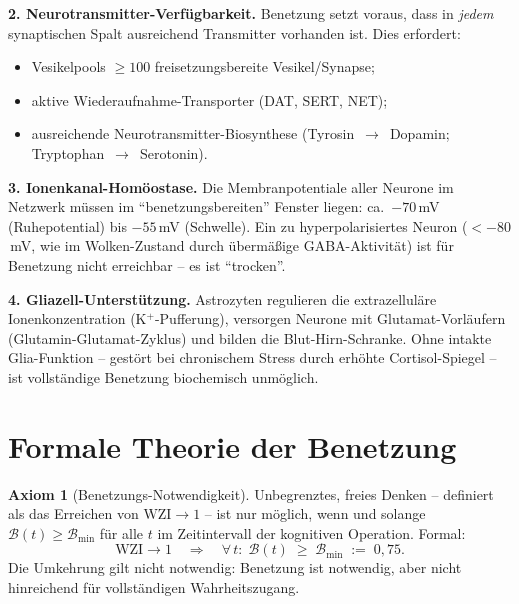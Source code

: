 ﻿\documentclass[12pt,a4paper]{report}
\theoremstyle{plain}
\theoremstyle{definition}
\newtheorem{axiom}[theorem]{Axiom}
\theoremstyle{remark}
\begin{document}
	\textbf{2. Neurotransmitter-Verfügbarkeit.}
	Benetzung setzt voraus, dass in \emph{jedem} synaptischen Spalt
	ausreichend Transmitter vorhanden ist. Dies erfordert:
	\begin{itemize}
		\item Vesikelpools $\geq 100$ freisetzungsbereite Vesikel/Synapse;
		\item aktive Wiederaufnahme-Transporter (DAT, SERT, NET);
		\item ausreichende Neurotransmitter-Biosynthese
		(Tyrosin~$\to$~Dopamin; Tryptophan~$\to$~Serotonin).
	\end{itemize}

	\textbf{3. Ionenkanal-Homöostase.}
	Die Membranpotentiale aller Neurone im Netzwerk müssen im
	``benetzungsbereiten'' Fenster liegen: ca.\ $-70$\,mV (Ruhepotential)
	bis $-55$\,mV (Schwelle). Ein zu hyperpolarisiertes Neuron
	($< -80$\,mV, wie im Wolken-Zustand durch übermäßige GABA-Aktivität)
	ist für Benetzung nicht erreichbar -- es ist ``trocken''.

	\textbf{4. Gliazell-Unterstützung.}
	Astrozyten regulieren die extrazelluläre Ionenkonzentration
	(K$^+$-Pufferung), versorgen Neurone mit Glutamat-Vorläufern
	(Glutamin-Glutamat-Zyklus) und bilden die Blut-Hirn-Schranke.
	Ohne intakte Glia-Funktion -- gestört bei chronischem Stress
	durch erhöhte Cortisol-Spiegel -- ist vollständige Benetzung
	biochemisch unmöglich.

	\section{Formale Theorie der Benetzung}

	\begin{axiom}[Benetzungs-Notwendigkeit]
		\label{axiom:benetzung}
		Unbegrenztes, freies Denken -- definiert als das Erreichen von
		$\mathrm{WZI} \to 1$ -- ist nur möglich, wenn und solange
		$\mathcal{B}(t) \geq \mathcal{B}_{\min}$ für alle $t$ im
		Zeitintervall der kognitiven Operation.
		Formal:
		\[
		\mathrm{WZI} \to 1
		\quad\Rightarrow\quad
		\forall\,t:\; \mathcal{B}(t) \;\geq\; \mathcal{B}_{\min} \;:=\; 0{,}75.
		\]
		Die Umkehrung gilt nicht notwendig: Benetzung ist notwendig,
		aber nicht hinreichend für vollständigen Wahrheitszugang.
	\end{axiom}
\end{document}
